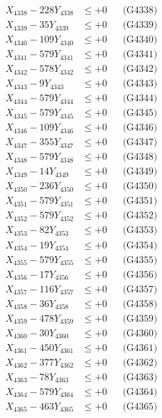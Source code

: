 \documentclass[a4paper,10pt]{article}
\begin{document}
{\begin{align}
X_{4338} - 228Y_{4338} &\leq +0 && \text{(G4338)} \\
X_{4339} - 35Y_{4339} &\leq +0 && \text{(G4339)} \\
X_{4340} - 109Y_{4340} &\leq +0 && \text{(G4340)} \\
\allowbreak
X_{4341} - 579Y_{4341} &\leq +0 && \text{(G4341)} \\
X_{4342} - 578Y_{4342} &\leq +0 && \text{(G4342)} \\
X_{4343} - 9Y_{4343} &\leq +0 && \text{(G4343)} \\
X_{4344} - 579Y_{4344} &\leq +0 && \text{(G4344)} \\
X_{4345} - 579Y_{4345} &\leq +0 && \text{(G4345)} \\
X_{4346} - 109Y_{4346} &\leq +0 && \text{(G4346)} \\
X_{4347} - 355Y_{4347} &\leq +0 && \text{(G4347)} \\
X_{4348} - 579Y_{4348} &\leq +0 && \text{(G4348)} \\
X_{4349} - 14Y_{4349} &\leq +0 && \text{(G4349)} \\
X_{4350} - 236Y_{4350} &\leq +0 && \text{(G4350)} \\
\allowbreak
X_{4351} - 579Y_{4351} &\leq +0 && \text{(G4351)} \\
X_{4352} - 579Y_{4352} &\leq +0 && \text{(G4352)} \\
X_{4353} - 82Y_{4353} &\leq +0 && \text{(G4353)} \\
X_{4354} - 19Y_{4354} &\leq +0 && \text{(G4354)} \\
X_{4355} - 579Y_{4355} &\leq +0 && \text{(G4355)} \\
X_{4356} - 17Y_{4356} &\leq +0 && \text{(G4356)} \\
X_{4357} - 116Y_{4357} &\leq +0 && \text{(G4357)} \\
X_{4358} - 36Y_{4358} &\leq +0 && \text{(G4358)} \\
X_{4359} - 478Y_{4359} &\leq +0 && \text{(G4359)} \\
X_{4360} - 30Y_{4360} &\leq +0 && \text{(G4360)} \\
\allowbreak
X_{4361} - 450Y_{4361} &\leq +0 && \text{(G4361)} \\
X_{4362} - 377Y_{4362} &\leq +0 && \text{(G4362)} \\
X_{4363} - 78Y_{4363} &\leq +0 && \text{(G4363)} \\
X_{4364} - 579Y_{4364} &\leq +0 && \text{(G4364)} \\
X_{4365} - 463Y_{4365} &\leq +0 && \text{(G4365)} \\

\end{align}}
\end{document}
